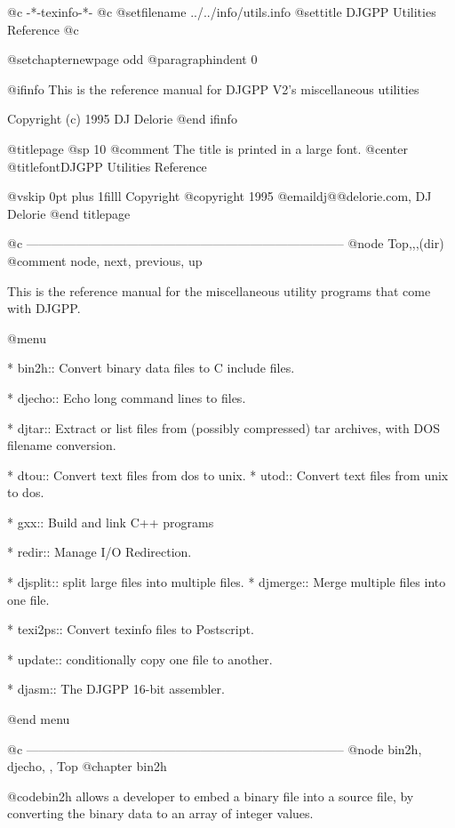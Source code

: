    @c -*-texinfo-*-
@c %
@setfilename ../../info/utils.info
@settitle DJGPP Utilities Reference
@c %

@setchapternewpage odd
@paragraphindent 0

@ifinfo
This is the reference manual for DJGPP V2's miscellaneous utilities

Copyright (c) 1995 DJ Delorie
@end ifinfo

@titlepage
@sp 10
@comment The title is printed in a large font.
@center @titlefont{DJGPP Utilities Reference}

@vskip 0pt plus 1filll
Copyright @copyright{} 1995 @email{dj@@delorie.com, DJ Delorie}
@end titlepage

@c -----------------------------------------------------------------------------
@node Top,,,(dir)
@comment node, next, previous, up

This is the reference manual for the miscellaneous utility programs that
come with DJGPP.

@menu

* bin2h::       Convert binary data files to C include files.

* djecho::      Echo long command lines to files.

* djtar::       Extract or list files from (possibly compressed)
                tar archives, with DOS filename conversion.

* dtou::        Convert text files from dos to unix.
* utod::        Convert text files from unix to dos.

* gxx::         Build and link C++ programs

* redir::       Manage I/O Redirection.

* djsplit::     split large files into multiple files.
* djmerge::     Merge multiple files into one file.

* texi2ps::     Convert texinfo files to Postscript.

* update::      conditionally copy one file to another.

* djasm::       The DJGPP 16-bit assembler.

@end menu

@c -----------------------------------------------------------------------------
@node bin2h, djecho, , Top
@chapter bin2h

@code{bin2h} allows a developer to embed a binary file into a source
file, by converting the binary data to an array of integer values.

